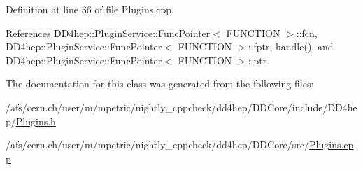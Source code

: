 Definition at line 36 of file Plugins.\+cpp.



References D\+D4hep\+::\+Plugin\+Service\+::\+Func\+Pointer$<$ F\+U\+N\+C\+T\+I\+O\+N $>$\+::fcn, D\+D4hep\+::\+Plugin\+Service\+::\+Func\+Pointer$<$ F\+U\+N\+C\+T\+I\+O\+N $>$\+::fptr, handle(), and D\+D4hep\+::\+Plugin\+Service\+::\+Func\+Pointer$<$ F\+U\+N\+C\+T\+I\+O\+N $>$\+::ptr.



The documentation for this class was generated from the following files\+:\begin{DoxyCompactItemize}
\item 
/afs/cern.\+ch/user/m/mpetric/nightly\+\_\+cppcheck/dd4hep/\+D\+D\+Core/include/\+D\+D4hep/\hyperlink{_plugins_8h}{Plugins.\+h}\item 
/afs/cern.\+ch/user/m/mpetric/nightly\+\_\+cppcheck/dd4hep/\+D\+D\+Core/src/\hyperlink{_plugins_8cpp}{Plugins.\+cpp}\end{DoxyCompactItemize}
